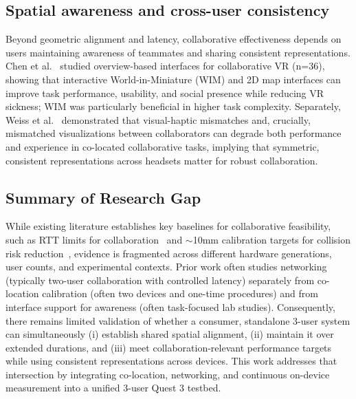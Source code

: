 \subsection{Spatial awareness and cross-user consistency}
Beyond geometric alignment and latency, collaborative effectiveness depends on users maintaining awareness of teammates and sharing consistent representations. Chen et al.~\cite{ChenLei2024Eoep} studied overview-based interfaces for collaborative VR (n=36), showing that interactive World-in-Miniature (WIM) and 2D map interfaces can improve task performance, usability, and social presence while reducing VR sickness; WIM was particularly beneficial in higher task complexity. Separately, Weiss et al.~\cite{WeissYannick2025ItEo} demonstrated that visual-haptic mismatches and, crucially, mismatched visualizations between collaborators can degrade both performance and experience in co-located collaborative tasks, implying that symmetric, consistent representations across headsets matter for robust collaboration.

\subsection{Summary of Research Gap}
While existing literature establishes key baselines for collaborative feasibility, such as RTT limits for collaboration~\cite{VanDammeSam2024Iolo} and $\sim$10mm calibration targets for collision risk reduction~\cite{ReimerDennis2021CfSV}, evidence is fragmented across different hardware generations, user counts, and experimental contexts. Prior work often studies networking (typically two-user collaboration with controlled latency) separately from co-location calibration (often two devices and one-time procedures) and from interface support for awareness (often task-focused lab studies). Consequently, there remains limited validation of whether a consumer, standalone 3-user system can simultaneously (i) establish shared spatial alignment, (ii) maintain it over extended durations, and (iii) meet collaboration-relevant performance targets while using consistent representations across devices. This work addresses that intersection by integrating co-location, networking, and continuous on-device measurement into a unified 3-user Quest 3 testbed.
